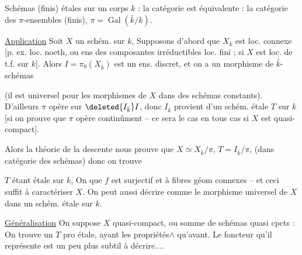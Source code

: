 Schémas (finis) étales sur un corps $k$ : la catégorie est équivalente : la catégorie des $\pi$-ensembles (finis), $\pi=\operatorname{Gal}(\bar k/k)$.

\uline{Application} Soit $X$ un schém. sur $k$, Supposons d'abord que $X_{\bar k}$ est loc. connexe [p. ex. loc. noeth, ou ens des composantes irréductibles loc. fini ;  si $X$ est loc. de t.f. sur $k$]. Alors $I=\pi_0(X_{\bar k})$ est un ens. discret, et on a un  morphisme de $\bar k$-schémas

(il est universel pour les morphismes de $X$ dans des schémas constants). D'ailleurs $\pi$ opère sur $\deleted{I_{\bar k}} I$, donc $I_{\bar k}$ provient d'un   schém. étale $T$ sur $k$ [si on prouve que $\pi$ opère continûment -- ce sera le cas en tous cas si $X$ est quasi-compact].


Alors la théorie de la descente nous prouve que $X\simeq X_{\bar k}/\pi$, $T=I_{\bar k}/\pi$, (dans catégorie des schémas) donc on trouve

$T$ étant étale sur $k$,  On  que $f$ est surjectif et à fibres géom connexes -- et ceci suffit à caractériser $X$. On peut aussi décrire comme le morphisme universel de $X$ dans un schém. étale sur $k$.


\uline{Généralisation} On suppose $X$ quasi-compact, ou somme de schémas quasi cpcts : On trouve un $T$  pro étale, ayant les  propriétés$\scriptscriptstyle\wedge$ qu'avant. Le foncteur qu'il représente est un peu plus subtil à décrire....

